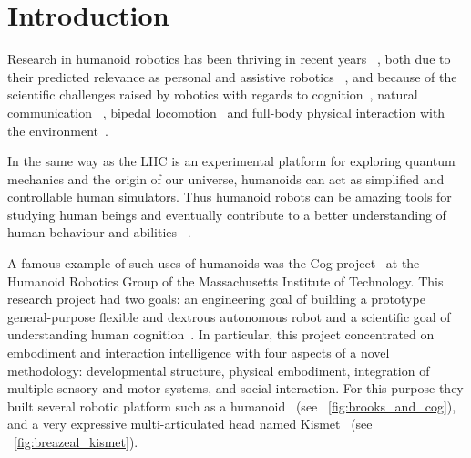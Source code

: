 
\cleartoleftpage


\chapter{Introduction} %


Research in humanoid robotics has been thriving in recent years~\cite{hirai1998development} \cite{kaneko2008humanoid}, both due to their predicted relevance as personal and assistive robotics~\cite{tapus2007socially} \cite{oztop2005human}, and because of the scientific challenges raised by robotics with regards to cognition~\cite{asada2001cognitive}, natural communication~\cite{stiefelhagen2004natural} \cite{breazeal2002robots}, bipedal locomotion~\cite{yamaguchi1999development} \cite{chestnutt2005footstep} \cite{collins2005bipedal} and full-body physical interaction with the environment~\cite{ude2004programming}.

In the same way as the LHC is an experimental platform for exploring quantum mechanics and the origin of our universe, humanoids can act as simplified and controllable human simulators. Thus humanoid robots can be amazing tools for studying human beings and eventually contribute to a better understanding of human behaviour and abilities~\cite{atkeson2000using} \cite{cheng2007cb} \cite{brooks1986achieving}.

A famous example of such uses of humanoids was the Cog project~\cite{brooks1999cog} at the Humanoid Robotics Group of the Massachusetts Institute of Technology. This research project had two goals: an engineering goal of building a prototype general-purpose flexible and dextrous autonomous robot and a scientific goal of understanding human cognition~\cite{brooks1994building}. In particular, this project concentrated on embodiment and interaction intelligence with four aspects of a novel methodology: developmental structure, physical embodiment, integration of multiple sensory and motor systems, and social interaction. For this purpose they built several robotic platform such as a humanoid~\cite{brooks1999cog} (see \figurename~\ref{fig:brooks_and_cog}), and a very expressive multi-articulated head named Kismet~\cite{breazeal2003emotion} (see \figurename~\ref{fig:breazeal_kismet}).




